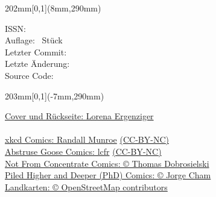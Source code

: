 {    \begin{textblock*}{202mm}[0,1](8mm,290mm)
        \begin{flushleft}
            \footnotesize\noindent
            ISSN: \\
            Auflage: \auflage\ Stück\\
            Letzter Commit: \\
            Letzte Änderung: \\
            Source Code: \\

        \end{flushleft}
    \end{textblock*}

    \begin{textblock*}{203mm}[0,1](-7mm,290mm)
        \begin{flushright}
            \footnotesize
            \href{https://mathphys.info/}{Cover und Rückseite: Lorena Ergenziger\\}\\ %
            \href{https://xkcd.com/}{xkcd Comics: Randall Munroe} \href{https://creativecommons.org/licenses/by-nc/2.5/}{(CC-BY-NC)}\\
            \href{https://abstrusegoose.com/}{Abstruse Goose Comics: lcfr} \href{https://creativecommons.org/licenses/by-nc/3.0/us/}{(CC-BY-NC)}\\
            \href{https://nfccomic.com}{Not From Concentrate Comics: \copyright{} Thomas Dobrosielski}\\
            \href{https://www.phdcomics.com/}{Piled Higher and Deeper (PhD) Comics: \copyright{} Jorge Cham}\\
            \href{https://www.openstreetmap.org/}{Landkarten: \copyright{} OpenStreetMap contributors}
        \end{flushright}
    \end{textblock*}
}

\graphicspath{{./bilder/}{./}}



